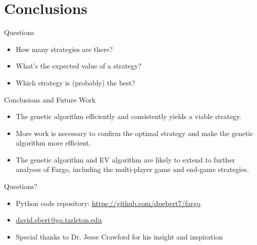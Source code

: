 \documentclass{beamer}
\begin{document}
\section{Conclusions}
  \begin{frame}{Questions}
  \begin{itemize}
    \item How many strategies are there?
    \item What's the expected value of a strategy?
    \item Which strategy is (probably) the best? 
    
  \end{itemize}
  \end{frame}
  
  \begin{frame}{Conclusions and Future Work}
  \begin{itemize}
  \item The genetic algorithm efficiently and consistently yields a viable strategy.
  \item More work is necessary to confirm the optimal strategy and make the genetic algorithm more efficient.
  \item The genetic algorithm and EV algorithm are likely to extend to further analyses of Fargo, including the multi-player game and end-game strategies.
  \end{itemize}
  \end{frame}

  \begin{frame}{Questions?}
  \begin{itemize}
  \item Python code repository:  \url{https://github.com/dpebert7/fargo}
  \vspace{5 pt}
  \item \url{david.ebert@go.tarleton.edu}
  \vspace{5 pt}
  \item Special thanks to Dr. Jesse Crawford for his insight and inspiration
  
  \end{itemize}

  \end{frame}
\end{document}
